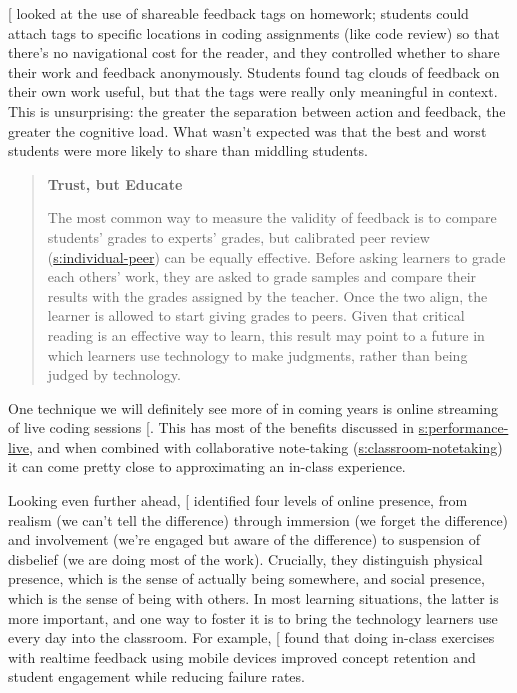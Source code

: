 {[}\protect[\hyperlink{b:Cumm2011}{Cumm2011}]{]} looked at the use of shareable feedback tags on
homework; students could attach tags to specific locations in coding
assignments (like code review) so that there's no navigational cost for
the reader, and they controlled whether to share their work and feedback
anonymously. Students found tag clouds of feedback on their own work
useful, but that the tags were really only meaningful in context. This
is unsurprising: the greater the separation between action and feedback,
the greater the cognitive load. What wasn't expected was that the best
and worst students were more likely to share than middling students.

\begin{quote}\setlength{\parindent}{0pt}
\textbf{Trust, but Educate}

The most common way to measure the validity of feedback is to compare
students' grades to experts' grades, but calibrated peer review
(\protect\hyperlink{SECTION}{s:individual-peer}) can be equally effective. Before
asking learners to grade each others' work, they are asked to grade
samples and compare their results with the grades assigned by the
teacher. Once the two align, the learner is allowed to start giving
grades to peers. Given that critical reading is an effective way to
learn, this result may point to a future in which learners use
technology to make judgments, rather than being judged by technology.
\end{quote}

One technique we will definitely see more of in coming years is online
streaming of live coding sessions {[}\protect[\hyperlink{b:Haar2017}{Haar2017}]{]}. This has most of
the benefits discussed in \protect\hyperlink{SECTION}{s:performance-live}, and when
combined with collaborative note-taking
(\protect\hyperlink{SECTION}{s:classroom-notetaking}) it can come pretty close to
approximating an in-class experience.

Looking even further ahead, {[}\protect[\hyperlink{b:Ijss2000}{Ijss2000}]{]} identified four levels of
online presence, from realism (we can't tell the difference) through
immersion (we forget the difference) and involvement (we're engaged but
aware of the difference) to suspension of disbelief (we are doing most
of the work). Crucially, they distinguish physical presence, which is
the sense of actually being somewhere, and social presence, which is the
sense of being with others. In most learning situations, the latter is
more important, and one way to foster it is to bring the technology
learners use every day into the classroom. For example,
{[}\protect[\hyperlink{b:Deb2018}{Deb2018}]{]} found that doing in-class exercises with realtime
feedback using mobile devices improved concept retention and student
engagement while reducing failure rates.

